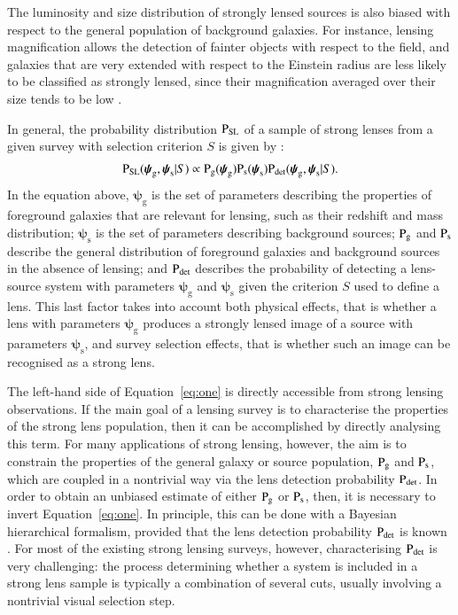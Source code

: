 \documentclass{aa}
\def\psilens{\boldsymbol{\psi}_\mathrm{g}}
\def\psisource{\boldsymbol{\psi}_\mathrm{s}}
\def\prlens{{\rm P}_\mathrm{g}}
\def\prsource{{\rm P}_\mathrm{s}}
\def\prsl{{\rm P}_\mathrm{{SL}}}
\def\pdet{{\rm P}_\mathrm{det}}
\def\Eref#1{Equation~\ref{#1}\xspace}
\begin{document}
The luminosity and size distribution of strongly lensed sources is also biased with respect to the general population of background galaxies.
For instance, lensing magnification allows the detection of fainter objects with respect to the field, and galaxies that are very extended with respect to the Einstein radius are less likely to be classified as strongly lensed, since their magnification averaged over their size tends to be low \citep[see also the discussion in section 5.3 of][]{O+A17}.

In general, the probability distribution $\prsl$ of a sample of strong lenses from a given survey with selection criterion $S$ is given by \citep{Son22}:
\begin{equation}\label{eq:one}
\prsl(\psilens,\psisource|S) \propto \prlens(\psilens)\prsource(\psisource)\pdet(\psilens,\psisource|S).
\end{equation}
In the equation above, $\psilens$ is the set of parameters describing the properties of foreground galaxies that are relevant for lensing, such as their redshift and mass distribution; $\psisource$ is the set of parameters describing background sources; $\prlens$ and $\prsource$ describe the general distribution of foreground galaxies and background sources in the absence of lensing; and $\pdet$ describes the probability of detecting a lens-source system with parameters $\psilens$ and $\psisource$ given the criterion $S$ used to define a lens.
This last factor takes into account both physical effects, that is whether a lens with parameters $\psilens$ produces a strongly lensed image of a source with parameters $\psisource$, and survey selection effects, that is whether such an image can be recognised as a strong lens.

The left-hand side of \Eref{eq:one} is directly accessible from strong lensing observations. If the main goal of a lensing survey is to characterise the properties of the strong lens population, then it can be accomplished by directly analysing this term. For many applications of strong lensing, however, the aim is to constrain the properties of the general galaxy or source population, $\prlens$ and $\prsource$, which are coupled in a nontrivial way via the lens detection probability $\pdet$.
In order to obtain an unbiased estimate of either $\prlens$ or $\prsource$, then, it is necessary to invert \Eref{eq:one}.
In principle, this can be done with a Bayesian hierarchical formalism, provided that the lens detection probability $\pdet$ is known \citep{Son22}.
For most of the existing strong lensing surveys, however, characterising $\pdet$ is very challenging: the process determining whether a system is included in a strong lens sample is typically a combination of several cuts, usually involving a nontrivial visual selection step. 
\end{document}

